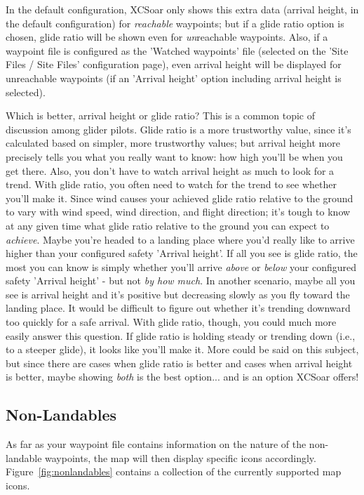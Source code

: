 In the default configuration, XCSoar only shows this extra data (arrival
height, in the default configuration) for \emph{reachable} waypoints;
but if a glide ratio option is chosen,
glide ratio will be shown even for \emph{un}reachable waypoints. Also, if a waypoint
file is configured as the 'Watched waypoints' file (selected on the
'Site Files / Site Files' configuration page),
even arrival height
will be displayed for unreachable waypoints
(if an 'Arrival height' option including arrival height is selected).

Which is better, arrival height or glide ratio? This is a common topic of
discussion among glider pilots. Glide ratio is a more trustworthy value, since
it's calculated based on simpler, more trustworthy values; but arrival height
more precisely tells you what you really want to know: how high you'll be
when you get there. Also, you don't have to watch arrival height as much to
look for a trend. With glide ratio, you often need to watch for the trend to see
whether you'll make it. Since wind causes your achieved glide ratio relative to the
ground to vary with wind speed, wind direction, and flight direction; it's tough
to know at any given time what glide ratio relative to the ground you can
expect to \emph{achieve}. Maybe you're
headed to a landing place where you'd really
like to arrive higher than your configured safety 'Arrival height'. If all you see is
glide ratio, the most you can know is simply whether you'll arrive \emph{above} or
\emph{below}
your configured safety 'Arrival height' - but not \emph{by how much}. In another
scenario, maybe all you see is arrival
height and it's positive but decreasing slowly as you fly toward the landing
place. It would be difficult to
figure out whether it's trending downward too quickly for a safe arrival.
With glide ratio, though, you could much more easily answer this question.
If glide ratio is holding steady or trending down (i.e., to a steeper glide),
it looks like you'll make it. More could be said on this subject, but since
there are cases when glide ratio is better
and cases when arrival height is better, maybe showing \emph{both} is the best
option... and is an option XCSoar offers!

\subsection*{Non-Landables}
As far as your waypoint file contains information on the nature of the 
non-landable waypoints, the map will then display specific icons accordingly. 
Figure~\ref{fig:nonlandables} contains a collection of the currently supported map icons.

